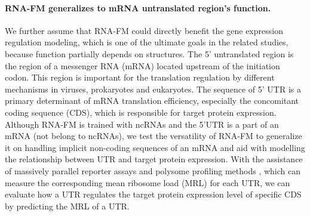 \paragraph{RNA-FM generalizes to mRNA untranslated region’s function.} We further assume that RNA-FM could directly benefit the gene expression regulation modeling, which is one of the ultimate goals in the related studies, because function partially depends on structures. 
The 5’ untranslated region is the region of a messenger RNA (mRNA) located upstream of the initiation codon. This region is important for the translation regulation by different mechanisms in viruses, prokaryotes and eukaryotes. The sequence of 5’ UTR is a primary determinant of mRNA translation efficiency, especially the concomitant coding sequence (CDS), which is responsible for target protein expression. Although RNA-FM is trained with ncRNAs and the 5'UTR is a part of an mRNA (not belong to ncRNAs), we test the versatility of RNA-FM to generalize it on handling implicit non-coding sequences of an mRNA and aid with modelling the relationship between UTR and target protein expression.
With the assistance of massively parallel reporter assays and polysome profiling methods \cite{sample2019human}, which can measure the corresponding mean ribosome load (MRL) for each UTR, we can evaluate how a UTR regulates the target protein expression level of specific CDS by predicting the MRL of a UTR.
 


